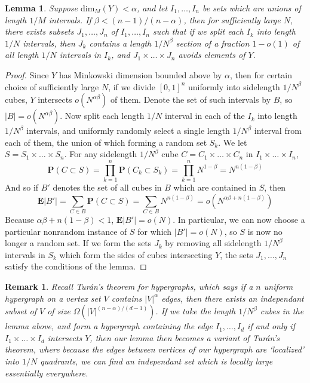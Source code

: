\documentclass{report}
\theoremstyle{plain}
\newtheorem{lemma}{Lemma}
\theoremstyle{plain}
\newtheorem*{remark}{Remark}
\begin{document}
\begin{lemma}
    Suppose $\text{dim}_M(Y) < \alpha$, and let $I_1, \dots, I_n$ be sets which are unions of length $1/M$ intervals. If $\beta < (n - 1)/(n - \alpha)$, then for sufficiently large $N$, there exists subsets $J_1, \dots, J_n$ of $I_1, \dots, I_n$ such that if we split each $I_k$ into length $1/N$ intervals, then $J_k$ contains a length $1/N^\beta$ section of a fraction $1 - o(1)$ of all length $1/N$ intervals in $I_k$, and $J_1 \times \dots \times J_n$ avoids elements of $Y$.
\end{lemma}
\begin{proof}
    Since $Y$ has Minkowski dimension bounded above by $\alpha$, then for certain choice of sufficiently large $N$, if we divide $[0,1]^n$ uniformly into sidelength $1/N^\beta$ cubes, $Y$ intersects $o(N^{\alpha \beta})$ of them. Denote the set of such intervals by $B$, so $|B| = o(N^{\alpha \beta})$. Now split each length $1/N$ interval in each of the $I_k$ into length $1/N^\beta$ intervals, and uniformly randomly select a single length $1/N^\beta$ interval from each of them, the union of which forming a random set $S_k$. We let $S = S_1 \times \dots \times S_n$. For any sidelength $1/N^\beta$ cube $C = C_1 \times \dots \times C_n$ in $I_1 \times \dots \times I_n$,
    \[ \mathbf{P}(C \subset S) = \prod_{k = 1}^n \mathbf{P}(C_k \subset S_k) = \prod_{k = 1}^n N^{1 - \beta} = N^{n(1 - \beta)} \]
    And so if $B'$ denotes the set of all cubes in $B$ which are contained in $S$, then
    \[ \mathbf{E}|B'| = \sum_{C \in B} \mathbf{P}(C \subset S) = \sum_{C \in B} N^{n(1 - \beta)} = o \left( N^{\alpha \beta + n(1 - \beta)} \right) \]
    Because $\alpha \beta + n (1 - \beta) < 1$, $\mathbf{E}|B'| = o(N)$. In particular, we can now choose a particular nonrandom instance of $S$ for which $|B'| = o(N)$, so $S$ is now no longer a random set. If we form the sets $J_k$ by removing all sidelength $1/N^\beta$ intervals in $S_k$ which form the sides of cubes intersecting $Y$, the sets $J_1, \dots, J_n$ satisfy the conditions of the lemma.
\end{proof}

\begin{remark}
    Recall Tur\'{a}n's theorem for hypergraphs, which says if a $n$ uniform hypergraph on a vertex set $V$ contains $|V|^\alpha$ edges, then there exists an independant subset of $V$ of size $\Omega(|V|^{(n - \alpha)/(d-1)})$. If we take the length $1/N^\beta$ cubes in the lemma above, and form a hypergraph containing the edge $I_1, \dots, I_d$ if and only if $I_1 \times \dots \times I_d$ intersects $Y$, then our lemma then becomes a variant of Tur\'{a}n's theorem, where because the edges between vertices of our hypergraph are `localized' into $1/N$ quadrants, we can find an independant set which is locally large essentially everywhere.
\end{remark}
\end{document}
